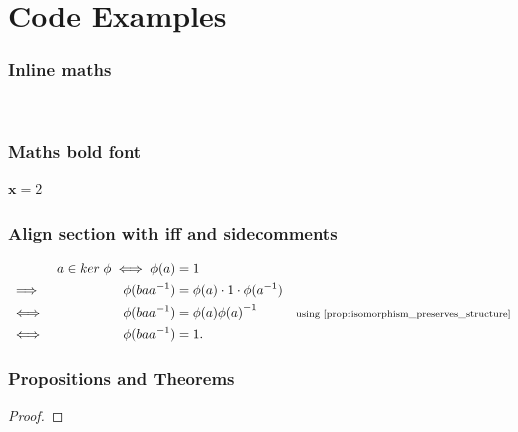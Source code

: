 \documentclass[MathsNotesBase.tex]{subfiles}
\date{\vspace{-6ex}}
\begin{document}
	\chapter*{Code Examples}
	
	\subsection{Inline maths}
	${}$ %
	${\bm{}}$ %
	
	\subsection{Maths bold font}
	$\bm{x} = 2$
	
	\subsection{Align section with iff and sidecomments}
	\begin{align*}
		&& a \in ker \; \phi \iff \phi(a) &= 1 \\
		&\implies & \phi(ba\inv{a}) &= \phi(a) \cdot 1 \cdot \phi(\inv{a}) \\
		&\iff & \phi(ba\inv{a}) &= \phi(a)\inv{\phi(a)} &\sidecomment{using \autoref{prop:isomorphism_preserves_structure}} \\
		&\iff & \phi(ba\inv{a}) &= 1.
	\end{align*}	

	\subsection{Propositions and Theorems}
	\begin{proof}
	\end{proof}
	
\end{document}
